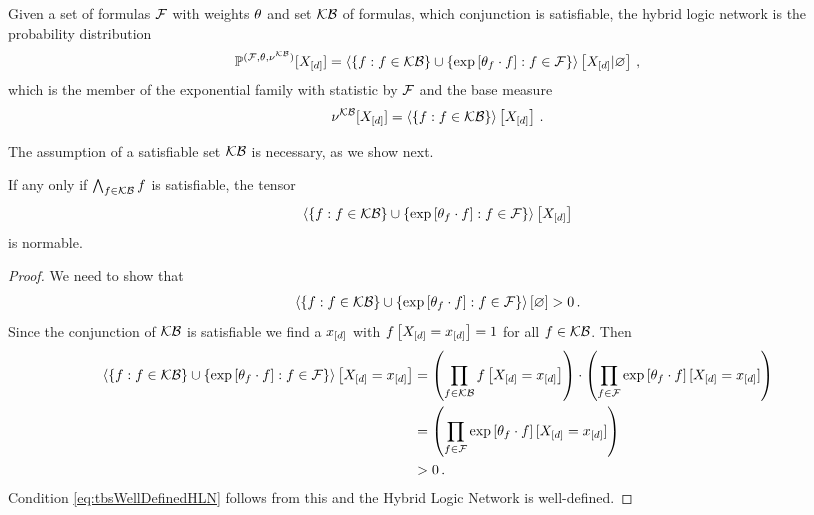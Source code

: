 \begin{definition}
	Given a set of formulas $\mathcal{F}$ with weights $\theta$ and set $\mathcal{KB}$ of formulas, which conjunction is satisfiable, the hybrid logic network is the probability distribution
	\begin{align*}
		\mathbb{P}^{(\mathcal{F},\theta,\nu^{\mathcal{KB}})}[X_{[d]}] 
		= \left\langle 
		\{f : f\in\mathcal{KB}\} \cup \{\mathrm{exp}\left[\theta_{f}\cdot f\right] : f\in\mathcal{F}\}
		\right\rangle \left[ X_{[d]} | \varnothing \right] \, ,
	\end{align*}
	which is the member of the exponential family with statistic by $\mathcal{F}$ and the base measure
		\[ \nu^{\mathcal{KB}}[X_{[d]}] = \left\langle \{f : f \in \mathcal{KB}\}\right\rangle \left[ X_{[d]} \right] \, .\]
\end{definition}

The assumption of a satisfiable set $\mathcal{KB}$ is necessary, as we show next.

\begin{theorem}
	If any only if $\bigwedge_{f\in\mathcal{KB}}f$ is satisfiable, the tensor 
		\[  \left\langle 
		\{f : f\in\mathcal{KB}\} \cup \{\mathrm{exp}\left[\theta_{f}\cdot f\right] : f\in\mathcal{F}\}
		\right\rangle \left[ X_{[d]} \right] \]
	is normable.
\end{theorem}
\begin{proof}
	We need to show that
	\begin{align}\label{eq:tbsWellDefinedHLN}
		\left\langle \{f : f\in\mathcal{KB}\} \cup \{\mathrm{exp}\left[\theta_{f}\cdot f\right] : f\in\mathcal{F}\}\right\rangle \left[ \varnothing \right] > 0 \, . 
	\end{align}
	Since the conjunction of $\mathcal{KB}$ is satisfiable we find a $x_{[d]}$ with $f\left[X_{[d]}=x_{[d]}\right]=1$ for all $f\in\mathcal{KB}$.
	Then 
	\begin{align*}
		 \left\langle \{f : f\in\mathcal{KB}\} \cup \{\mathrm{exp}\left[\theta_{f}\cdot f\right] : f\in\mathcal{F}\}\right\rangle \left[ X_{[d]}=x_{[d]} \right]  
		 & = \left( \prod_{f\in\mathcal{KB}}f\left[X_{[d]}=x_{[d]}\right] \right) 
		 \cdot \left( \prod_{f\in\mathcal{F}}\mathrm{exp}\left[\theta_{f}\cdot f\right][X_{[d]}=x_{[d]}] \right) \\
		 & =  \left( \prod_{f\in\mathcal{F}}\mathrm{exp}\left[\theta_{f}\cdot f\right][X_{[d]}=x_{[d]}] \right) \\
		 & > 0 \, . 
	\end{align*}
	Condition \eqref{eq:tbsWellDefinedHLN} follows from this and the Hybrid Logic Network is well-defined.
\end{proof}


